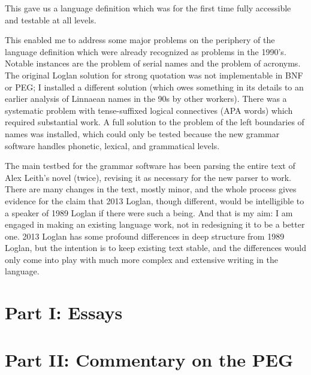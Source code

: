 \documentclass[12pt]{article}
\begin{document}
This gave us a language definition which was for the first time fully accessible and testable at all levels.

This enabled me to address some major problems on the periphery of the language definition which were already recognized as problems in the 1990's.  Notable instances are the problem of serial names and the problem of acronyms.  The original Loglan solution for strong quotation was not implementable in BNF or PEG;  I installed a different solution (which owes something in its details to an earlier analysis of Linnaean names in the 90s by other workers).  There was a systematic problem with tense-suffixed logical connectives (APA words) which required substantial work.  A full solution to the problem of the left boundaries of names was installed, which could only be tested because the new grammar software handles phonetic, lexical, and grammatical levels.

The main testbed for the grammar software has been parsing the entire text of Alex Leith's novel (twice),
revising it as necessary for the new parser to work.  There are many changes in the text, mostly minor, and the whole process gives evidence for the claim that 2013 Loglan, though different, would be intelligible to a speaker of 1989 Loglan if there were such a being.  And that is my aim:  I am engaged in making an existing language work, not in redesigning it to be a better one.   2013 Loglan has some profound differences in deep structure from 1989 Loglan, but the intention is to keep existing text stable, and the differences would only come into play with much more complex and extensive writing in the language.

\newpage

\section{Part I:  Essays}

\newpage

\section{Part II:  Commentary on the PEG}
\end{document}
